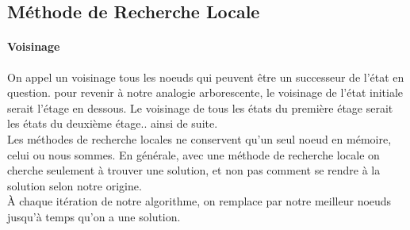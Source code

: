\documentclass{book}
\begin{document}
\subsection{Méthode de Recherche Locale}
\paragraph{Voisinage}
On appel un voisinage tous les noeuds qui peuvent être un successeur de l'état en question. pour revenir à notre analogie arborescente, le voisinage de l'état initiale serait l'étage en dessous. Le voisinage de tous les états du première étage serait les états du deuxième étage.. ainsi de suite.\\

Les méthodes de recherche locales ne conservent qu'un seul noeud en mémoire, celui ou nous sommes. En générale, avec une méthode de recherche locale on cherche seulement à trouver une solution, et non pas comment se rendre à la solution selon notre origine.\\

À chaque itération de notre algorithme, on remplace par notre meilleur noeuds jusqu'à temps qu'on a une solution.
\end{document}
